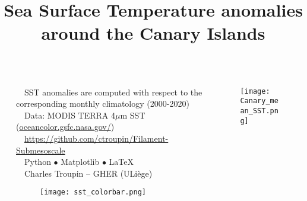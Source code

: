 \documentclass[11pt,a4paper,svgnames,final]{beamer}
\title{Sea Surface Temperature anomalies\\ around the Canary Islands}
\begin{document}
\begin{columns}[T]
\begin{column}{2cm}

\end{column}

\begin{column}{.5\textwidth}

\begin{block}
\large
\faInfoCircle~~SST anomalies are computed with respect to the corresponding monthly climatology (2000-2020)\\ 
\faLink~~Data: MODIS TERRA 4$\mu$m SST (\url{oceancolor.gsfc.nasa.gov/})\\
\faGithub~~\url{https://github.com/ctroupin/Filament-Submesoscale}\\
\faWrench~~Python $\bullet$ Matplotlib $\bullet$ \LaTeX\\
\faCreativeCommons~~Charles Troupin -- GHER (ULiège)
\end{block}

\begin{figure}
\centering
\texttt{[image: sst\_colorbar.png]}
\end{figure}

\end{column}

\begin{column}{.5\textwidth}

\begin{figure}
\centering
\texttt{[image: Canary\_mean\_SST.png]}
\end{figure}
\end{column}
\end{columns}
\end{document}
